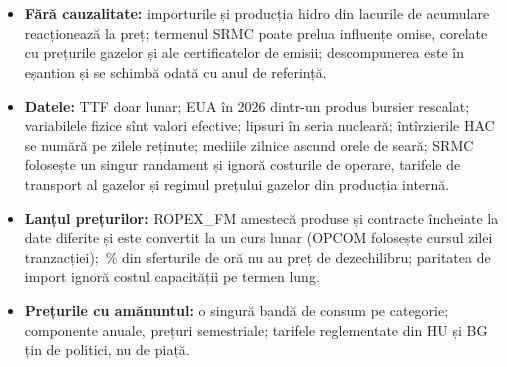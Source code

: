 \section{}
{\small
\begin{itemize}
\item {}%
{\textbf{Fără cauzalitate:} importurile și producția hidro din lacurile de acumulare reacționează la preț; termenul SRMC poate prelua influențe omise, corelate cu prețurile gazelor și ale certificatelor de emisii; descompunerea este în eșantion și se schimbă odată cu anul de referință.}
\item {}%
{\textbf{Datele:} TTF doar lunar; EUA în 2026 dintr-un produs bursier rescalat; variabilele fizice sînt valori efective; lipsuri în seria nucleară; întîrzierile HAC se numără pe zilele reținute; mediile zilnice ascund orele de seară; SRMC folosește un singur randament și ignoră costurile de operare, tarifele de transport al gazelor și regimul prețului gazelor din producția internă.}
\item {}%
{\textbf{Lanțul prețurilor:} ROPEX\_FM amestecă produse și contracte încheiate la date diferite și este convertit la un curs lunar (OPCOM folosește cursul zilei tranzacției); \NblankImb\,\% din sferturile de oră nu au preț de dezechilibru; paritatea de import ignoră costul capacității pe termen lung.}
\item {}%
{\textbf{Prețurile cu amănuntul:} o singură bandă de consum pe categorie; componente anuale, prețuri semestriale; tarifele reglementate din HU și BG țin de politici, nu de piață.}
\end{itemize}

}
